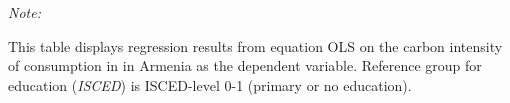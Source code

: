 \begin{table}[htbp!]
\begin{adjustbox}{width = 1\textwidth, max height = 0.95\textheight, center}
\begin{threeparttable}[b]
         \begin{tablenotes}\item \medskip \textit{Note:}
            \item This table displays regression results from equation OLS on the carbon intensity of consumption in  in Armenia as the dependent variable. Reference group for education (\textit{ISCED}) is ISCED-level 0-1 (primary or no education).
         \end{tablenotes}
      \end{threeparttable}
   \end{adjustbox}
\end{table}


